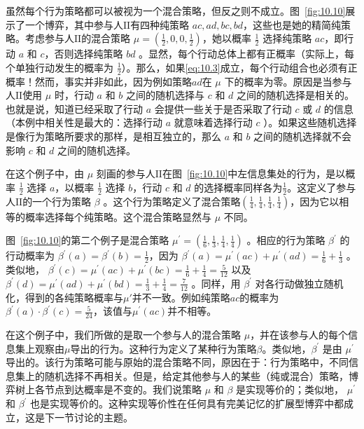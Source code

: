 虽然每个行为策略都可以被视为一个混合策略，但反之则不成立。图~\ref{fig:10.10}展示了一个博弈，其中参与人$\mathrm{II}$有四种纯策略 \({ac},{ad},{bc},{bd}\)，这些也是她的精简纯策略。考虑参与人$\mathrm{II}$的混合策略 \(\mu  = \left( {\frac{1}{2},0,0,\frac{1}{2}}\right)\)，她以概率 \(\frac{1}{2}\) 选择纯策略 \({ac}\)，即行动 \(a\) 和 \(c\)，否则选择纯策略 \({bd}\) 。显然，每个行动总体上都有正概率（实际上，每个单独行动发生的概率为 \(\frac{1}{2}\)）。那么，如果\eqref{eq:10.3}成立，每个行动组合也必须有正概率！然而，事实并非如此，因为例如策略$ad$在 \(\mu\) 下的概率为零。原因是当参与人$\mathrm{II}$使用 \(\mu\) 时，行动 \(a\) 和 \(b\) 之间的随机选择与 \(c\) 和 \(d\) 之间的随机选择是相关的。也就是说，知道已经采取了行动 \(a\) 会提供一些关于是否采取了行动 \(c\) 或 \(d\) 的信息（本例中相关性是最大的：选择行动 \(a\) 就意味着选择行动 \(c\) ）。如果这些随机选择是像行为策略所要求的那样，是相互独立的，那么 \(a\) 和 \(b\) 之间的随机选择就不会影响 \(c\) 和 \(d\) 之间的随机选择。

在这个例子中，由 \(\mu\) 刻画的参与人$\mathrm{II}$在图~\ref{fig:10.10}中左信息集处的行为，是以概率 \(\frac{1}{2}\) 选择 \(a\)，以概率 \(\frac{1}{2}\) 选择 \(b\)，行动 \(c\) 和 \(d\) 的选择概率同样各为\(\frac{1}{2}\)。这定义了参与人$\mathrm{II}$的一个行为策略 \(\beta\) 。这个行为策略定义了混合策略\(\left( {\frac{1}{4},\frac{1}{4},\frac{1}{4},\frac{1}{4}}\right)\)，因为它以相等的概率选择每个纯策略。这个混合策略显然与 \(\mu\) 不同。

图~\ref{fig:10.10}的第二个例子是混合策略 \({\mu }^{\prime } = \left( {\frac{1}{6},\frac{1}{3},\frac{1}{4},\frac{1}{4}}\right)\) 。相应的行为策略 \({\beta }^{\prime }\) 的行动概率为 \({\beta }^{\prime }\left( a\right)  = {\beta }^{\prime }\left( b\right)  = \frac{1}{2}\)，因为 \({\beta }^{\prime }\left( a\right)  = {\mu }^{\prime }\left( {ac}\right)  + {\mu }^{\prime }\left( {ad}\right)  = \frac{1}{6} + \frac{1}{3}\) 。类似地， \({\beta }^{\prime }\left( c\right)  = {\mu }^{\prime }\left( {ac}\right)  + {\mu }^{\prime }\left( {bc}\right)  = \frac{1}{6} + \frac{1}{4} = \frac{5}{12}\) 以及\({\beta }^{\prime }\left( d\right)  = {\mu }^{\prime }\left( {ad}\right)  + {\mu }^{\prime }\left( {bd}\right)  = \frac{1}{3} + \frac{1}{4} = \frac{7}{12}\) 。同样，用 \({\beta }^{\prime }\) 对各行动做独立随机化，得到的各纯策略概率与$\mu'$并不一致。例如纯策略\({ac}\)的概率为 \({\beta }^{\prime }\left( a\right)  \cdot  {\beta }^{\prime }\left( c\right)  = \frac{5}{24}\)，该值与\({\mu }^{\prime }\left( {ac}\right)\)并不相等。

在这个例子中，我们所做的是取一个参与人的混合策略 \(\mu\)，并在该参与人的每个信息集上观察由\(\mu\)导出的行为。这种行为定义了某种行为策略\(\beta\)。类似地，\({\beta }^{\prime }\) 是由 \({\mu}^{\prime}\)导出的。该行为策略可能与原始的混合策略不同，原因在于：行为策略中，不同信息集上的随机选择不再相关。但是，给定其他参与人的某些（纯或混合）策略，博弈树上各节点到达概率是不变的。我们说策略 \(\mu\) 和 \(\beta\) 是实现等价的；类似地， \({\mu }^{\prime }\) 和 \({\beta }^{\prime }\) 也是实现等价的。这种实现等价性在任何具有完美记忆的扩展型博弈中都成立，这是下一节讨论的主题。

